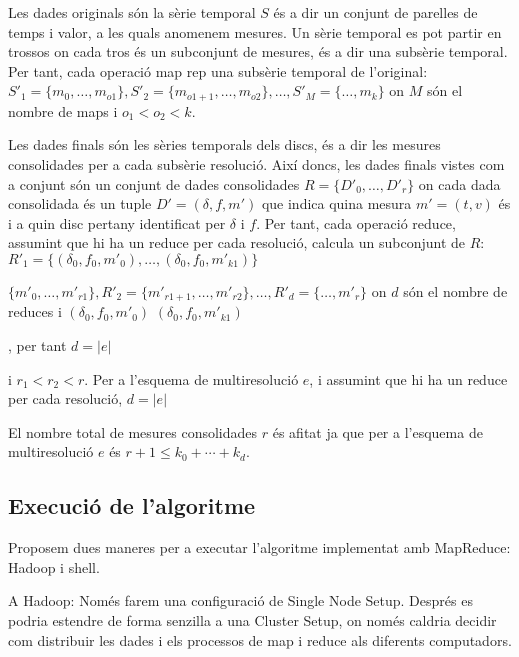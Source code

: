 





Les dades originals són la sèrie temporal $S$ és a dir un conjunt de
parelles de temps i valor, a les quals anomenem mesures. Un sèrie
temporal es pot partir en trossos on cada tros és un subconjunt de
mesures, és a dir una subsèrie temporal. Per tant, cada operació map
rep una subsèrie temporal de l'original: $S'_1 =
\{m_0,\dotsc,m_{o1}\}, S'_2 = \{m_{o1+1},\dotsc,m_{o2}\}, \dotsc, S'_M
= \{\dotsc,m_{k}\}$ on $M$ són el nombre de maps i $o_1 < o_2 < k$.



Les dades finals són les sèries temporals dels discs, és a dir les
mesures consolidades per a cada subsèrie resolució. Així doncs, les
dades finals vistes com a conjunt són un conjunt de dades
consolidades $R=\{ D'_{0}, \dotsc, D'_r\}$ on cada dada consolidada
és un tuple $D'=(\delta,f,m')$ que indica quina mesura $m'=(t,v)$ és i a
quin disc pertany identificat per $\delta$ i $f$.  Per tant, cada
operació reduce, assumint que hi ha un
reduce per cada resolució, calcula un subconjunt de $R$: $R'_1 = \{(\delta_0,f_0,m'_0),\dotsc,(\delta_0,f_0,m'_{k1})\}$

$\{m'_0,\dotsc,m'_{r1}\}, R'_2 = \{m'_{r1+1},\dotsc,m'_{r2}\}, \dotsc,
R'_d = \{\dotsc,m'_{r}\}$ on $d$ són el nombre de reduces
i $(\delta_0,f_0,m'_0)$   $(\delta_0,f_0,m'_{k1})$  






, per tant  $d=|e|$ 


 i $r_1 < r_2
< r$.  Per a l'esquema de multiresolució $e$, i assumint que hi ha un
reduce per cada resolució, $d=|e|$ 

El nombre total de mesures consolidades $r$ és afitat ja
que per a l'esquema de multiresolució $e$ és $r+1 \leq k_0+\dotsb+k_d$.










\subsection{Execució de l'algoritme}

Proposem dues maneres per a executar l'algoritme implementat amb
MapReduce: Hadoop i shell.  


A Hadoop:\todo{}
Només farem una configuració de Single Node Setup. 
Després es podria estendre de forma senzilla a una Cluster Setup, on
només caldria decidir com distribuir les dades i els processos de map
i reduce als diferents computadors.


